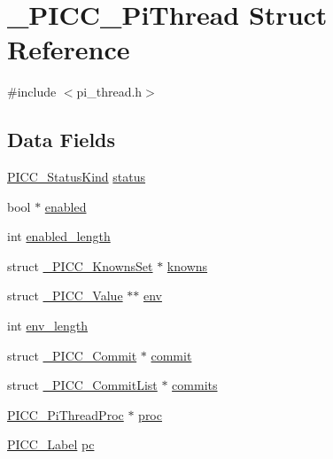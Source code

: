 \hypertarget{struct__PICC__PiThread}{\section{\-\_\-\-P\-I\-C\-C\-\_\-\-Pi\-Thread Struct Reference}
\label{struct__PICC__PiThread}
}


{\ttfamily \#include $<$pi\-\_\-thread.\-h$>$}

\subsection*{Data Fields}
{\bf }\par
\begin{DoxyCompactItemize}
\item 
\hyperlink{pi__thread_8h_ad84837e3a6881fa52eadad5f96b0444a}{P\-I\-C\-C\-\_\-\-Status\-Kind} \hyperlink{struct__PICC__PiThread_a08e8708363d2deb97335407398229118}{status}
\item 
bool $\ast$ \hyperlink{struct__PICC__PiThread_a1f2c99b2169bd58582a8b4320c2106a0}{enabled}
\item 
int \hyperlink{struct__PICC__PiThread_a0443e5525ef66064fbfb5ea4722f0fda}{enabled\-\_\-length}
\item 
struct \hyperlink{struct__PICC__KnownsSet}{\-\_\-\-P\-I\-C\-C\-\_\-\-Knowns\-Set} $\ast$ \hyperlink{struct__PICC__PiThread_aa1110c046d4ccd425e20e5a99de6dbac}{knowns}
\item 
struct \hyperlink{struct__PICC__Value}{\-\_\-\-P\-I\-C\-C\-\_\-\-Value} $\ast$$\ast$ \hyperlink{struct__PICC__PiThread_a2ad1dca93b2d7b8227d400a5f0fd5003}{env}
\item 
int \hyperlink{struct__PICC__PiThread_a8fce59a9f1cf87c981af443cba62fb86}{env\-\_\-length}
\item 
struct \hyperlink{struct__PICC__Commit}{\-\_\-\-P\-I\-C\-C\-\_\-\-Commit} $\ast$ \hyperlink{struct__PICC__PiThread_a7fabb4c7acd615b20bdccd6ed32ff4f8}{commit}
\item 
struct \hyperlink{struct__PICC__CommitList}{\-\_\-\-P\-I\-C\-C\-\_\-\-Commit\-List} $\ast$ \hyperlink{struct__PICC__PiThread_af9256cdd22994cccbe76e7ef530430f8}{commits}
\item 
\hyperlink{pi__thread_8h_a0d65636a870782d26eb035fe3b841414}{P\-I\-C\-C\-\_\-\-Pi\-Thread\-Proc} $\ast$ \hyperlink{struct__PICC__PiThread_a2ad879cabbe165e57b105c4060c565a1}{proc}
\item 
\hyperlink{pi__thread_8h_ae23ad6ae115253385182f5a898d32c1e}{P\-I\-C\-C\-\_\-\-Label} \hyperlink{struct__PICC__PiThread_a92b638ec192f3beaa4b3a509124a539d}{pc}
$$
\end{DoxyCompactItemize}
